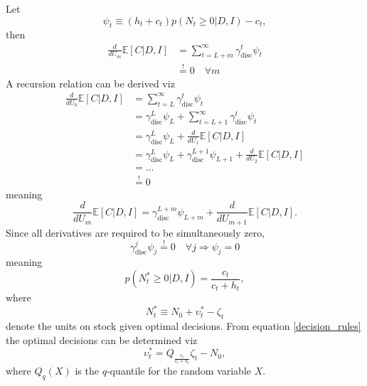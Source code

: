Let
\begin{equation}
	\psi_t\equiv (h_t+c_t)p(N_t\geq 0|D,I)-c_t,
\end{equation} 
then
\begin{equation}
	\begin{split}
		\frac{d}{dU_m}\mathbb{E}[C|D,I]& = \sum_{t=L+m}^{\infty}\gamma_{\text{disc}}^{t}\psi_t\\
		&\overset{!}{=} 0\quad \forall m
	\end{split}
\end{equation}
A recursion relation can be derived viz
\begin{equation}
	\begin{split}
		\frac{d}{dU_0}\mathbb{E}[C|D,I] & = \sum_{t=L}^{\infty}\gamma_{\text{disc}}^{t}\psi_t\\
		& =\gamma_{\text{disc}}^{L}\psi_L+\sum_{t=L+1}^{\infty}\gamma_{\text{disc}}^{t}\psi_t\\
		& =\gamma_{\text{disc}}^{L}\psi_L+\frac{d}{dU_1}\mathbb{E}[C|D,I]\\
		& =\gamma_{\text{disc}}^{L}\psi_L+\gamma_{\text{disc}}^{L+1}\psi_{L+1}+\frac{d}{dU_2}\mathbb{E}[C|D,I]\\
		&=\dots\\
		&\overset{!}{=} 0
	\end{split} 
\end{equation}
meaning
\begin{equation}
		\frac{d}{dU_m}\mathbb{E}[C|D,I] =\gamma_{\text{disc}}^{L+m}\psi_{L+m}+\frac{d}{dU_{m+1}}\mathbb{E}[C|D,I]. 
\end{equation}
Since all derivatives are required to be simultaneously zero,
\begin{equation}
	\gamma_{\text{disc}}^{j}\psi_j\overset{!}{=} 0\quad \forall j \Rightarrow \psi_j=0
\end{equation}
meaning
\begin{equation}
	p(N_t^*\geq 0|D,I)=\frac{c_t}{c_t+h_t},
	\label{decision_rules}
\end{equation}
where
\begin{equation}
	N_t^*\equiv N_0+\upsilon_t^*-\zeta_t
\end{equation}
denote the units on stock given optimal decisions. From equation \eqref{decision_rules} the optimal decisions can be determined viz
\begin{equation}
	\upsilon_t^* = Q_{\frac{c_t}{c_t+h_t}}\zeta_t-N_0,
\end{equation}
where $Q_q(X)$ is the $q$-quantile for the random variable $X$.
